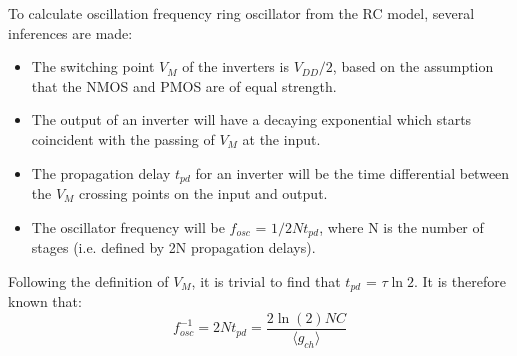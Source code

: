 		To calculate oscillation frequency ring oscillator from the RC model, several inferences are made:
		\begin{itemize}
			\item The switching point $V_M$ of the inverters is $V_{DD}/2$, based on the assumption that the NMOS and PMOS are of equal strength.
			\item The output of an inverter will have a decaying exponential which starts coincident with the passing of $V_M$ at the input.
			\item The propagation delay $t_{pd}$ for an inverter will be the time differential between the $V_M$ crossing points on the input and output.
			\item The oscillator frequency will be $f_{osc}$ = $1/2Nt_{pd}$, where N is the number of stages (i.e. defined by 2N propagation delays).
		\end{itemize}
			Following the definition of $V_M$, it is trivial to find that $t_{pd}$ = $\tau\ln2$. It is therefore known that:
		\begin{equation}
			f_{osc}^{-1} = 2Nt_{pd} = \frac{2\ln(2)NC}{\langle g_{ch}\rangle}
		\end{equation}

